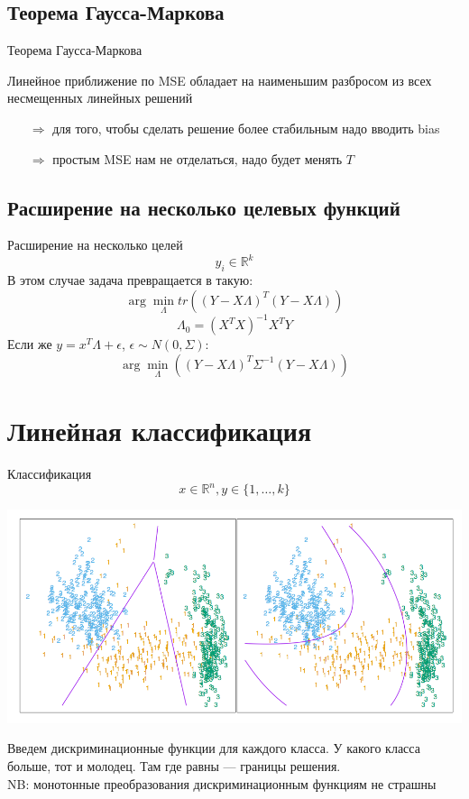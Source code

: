 \documentclass[14pt, fleqn, xcolor={dvipsnames, table}]{beamer}
\begin{document}
\subsection{Теорема Гаусса-Маркова}
\begin{frame}{Теорема Гаусса-Маркова}
\begin{theorem}[]
Линейное приближение по MSE обладает на наименьшим разбросом из всех несмещенных линейных решений
\end{theorem}
\begin{itemize}
\item[$\Rightarrow$] для того, чтобы сделать решение более стабильным надо вводить bias
\item[$\Rightarrow$] простым MSE нам не отделаться, надо будет менять $T$
\end{itemize}
\end{frame}

\subsection{Расширение на несколько целевых функций}
\begin{frame}{Расширение на несколько целей}
$$
y_i \in \mathbb{R}^k
$$
В этом случае задача превращается в такую:
$$
\arg \min_\Lambda tr\left((Y - X\Lambda)^T(Y - X\Lambda)\right)
$$
$$
\Lambda_0 = \left(X^TX\right)^{-1} X^TY
$$
Если же $y = x^T\Lambda + \epsilon$, $\epsilon \sim N(0, \Sigma)$:
$$
\arg \min_\Lambda \left((Y - X\Lambda)^T\Sigma^{-1}(Y - X\Lambda)\right)
$$
\end{frame}

\section{Линейная классификация}
\begin{frame}{Классификация}
$$
x \in \mathbb{R}^n, y \in \{1,\ldots, k\}
$$
\begin{center}
\includegraphics[height=0.4\textheight]{4_1.png}
\end{center}
\small
Введем дискриминационные функции для каждого класса. У какого класса больше, тот и молодец. Там где равны --- границы решения.\\
NB: монотонные преобразования дискриминационным функциям не страшны
\end{frame}
\end{document}
